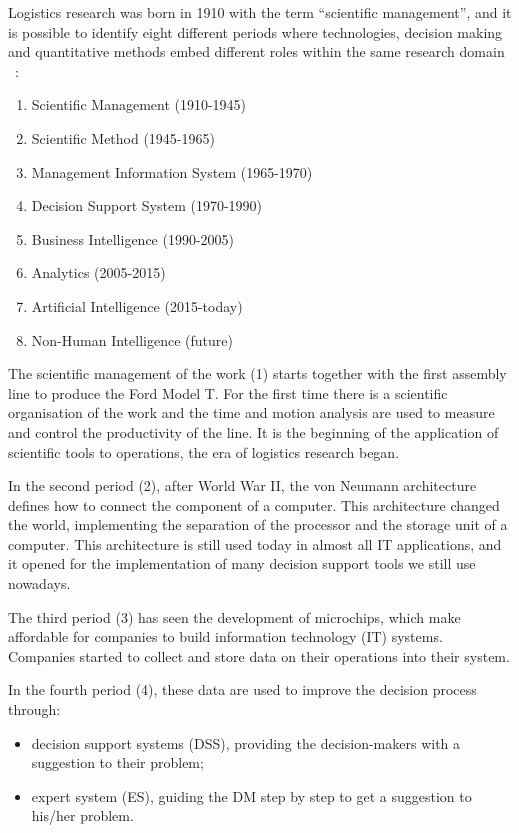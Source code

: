Logistics research was born in 1910 with the term “scientific management”, and it is possible to identify eight different periods where technologies, decision making and quantitative methods embed different roles within the same research domain ~\cite{Mortenson2015}:

\begin{enumerate}
    \item Scientific Management (1910-1945)
    \item Scientific Method (1945-1965)
    \item Management Information System (1965-1970)
    \item Decision Support System (1970-1990)
    \item Business Intelligence (1990-2005)
    \item Analytics (2005-2015)
    \item Artificial Intelligence (2015-today)
    \item Non-Human Intelligence (future)

\end{enumerate}

The scientific management of the work (1) starts together with the first assembly line to produce the Ford Model T. For the first time there is a scientific organisation of the work and the time and motion analysis are used to measure and control the productivity of the line. It is the beginning of the application of scientific tools to operations, the era of logistics research began.\par

In the second period (2), after World War II, the von Neumann architecture defines how to connect the component of a computer. This architecture changed the world, implementing the separation of the processor and the storage unit of a computer. This architecture is still used today in almost all IT applications, and it opened for the implementation of many decision support tools we still use nowadays.\par

The third period (3) has seen the development of microchips, which make affordable for companies to build information technology (IT) systems. Companies started to collect and store data on their operations into their system.\par

In the fourth period (4), these data are used to improve the decision process through: 

\begin{itemize}
    \item decision support systems (DSS), providing the decision-makers with a suggestion to their problem;
    \item expert system (ES), guiding the DM step by step to get a suggestion to his/her problem.

\end{itemize}

